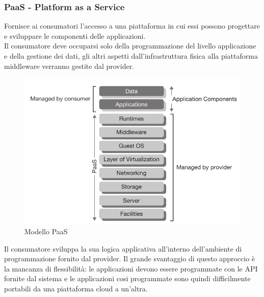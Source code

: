 \documentclass{article}
\begin{document}
\subsubsection{PaaS - Platform as a Service}
Fornisce ai consumatori l’accesso a una piattaforma in cui essi possono progettare e sviluppare le componenti delle applicazioni.\\
Il consumatore deve occuparsi solo della programmazione del livello applicazione e della gestione dei dati, gli altri aspetti dall’infrastruttura fisica alla piattaforma middleware verranno gestite dal provider.
\begin{figure}[H]
    \centering
    \includegraphics[scale=0.5]{img/paas.png}
    \caption{Modello PaaS}
\end{figure}
\noindent
Il consumatore sviluppa la sua logica applicativa all’interno dell’ambiente di programmazione fornito dal provider. Il grande svantaggio di questo approccio è la mancanza di flessibilità: le applicazioni devono essere programmate con le API fornite dal sistema e le applicazioni cosi programmate sono quindi difficilmente portabili da una piattaforma cloud a un’altra.
\end{document}
